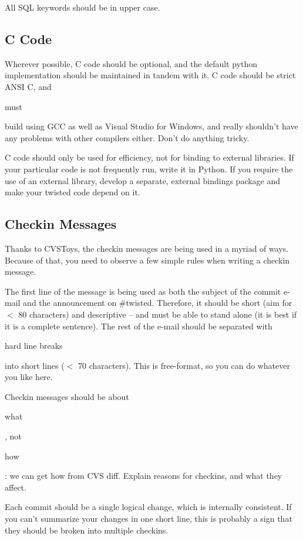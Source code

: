 All SQL keywords should be in upper case.

\subsection{C Code}


Wherever possible, C code should be optional, and the     default python implementation should be maintained in tandem     with it. C code should be strict ANSI C, and     \begin{em}must\end{em} build using GCC as well as Visual Studio     for Windows, and really shouldn't have any problems with other     compilers either. Don't do anything tricky.

C code should only be used for efficiency, not for binding     to external libraries. If your particular code is not     frequently run, write it in Python. If you require the use of     an external library, develop a separate, external bindings     package and make your twisted code depend on it.

\subsection{Checkin Messages}


Thanks to CVSToys, the checkin messages are being used in a myriad     of ways. Because of that, you need to observe a few simple rules when     writing a checkin message.

The first line of the message is being used as both the subject of     the commit e-mail and the announcement on \#twisted. Therefore, it should     be short (aim for $<$ 80 characters) and descriptive -- and must be     able to stand alone (it is best if it is a complete sentence). The rest     of the e-mail should be separated with \begin{em}hard line breaks\end{em} into     short lines ($<$ 70 characters). This is free-format, so you can do     whatever you like here.

Checkin messages should be about \begin{em}what\end{em}, not \begin{em}how\end{em}: we     can get how from CVS diff. Explain reasons for checkins, and what they     affect.

Each commit should be a single logical change, which is internally     consistent. If you can't summarize your changes in one short line, this     is probably a sign that they should be broken into multiple checkins.

